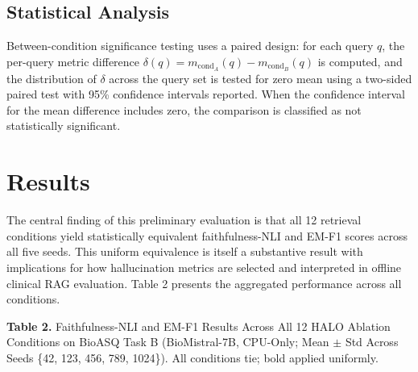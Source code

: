 \documentclass{article}
\begin{document}
\subsection{Statistical Analysis}

\label{sec:statistical_analysis}

Between-condition significance testing uses a paired design: for each query $q$, the per-query metric difference $\delta(q) = m_{\text{cond}_A}(q) - m_{\text{cond}_B}(q)$ is computed, and the distribution of $\delta$ across the query set is tested for zero mean using a two-sided paired test with 95\% confidence intervals reported. When the confidence interval for the mean difference includes zero, the comparison is classified as not statistically significant.

\section{Results}

\label{sec:results}

The central finding of this preliminary evaluation is that all 12 retrieval conditions yield statistically equivalent faithfulness-NLI and EM-F1 scores across all five seeds. This uniform equivalence is itself a substantive result with implications for how hallucination metrics are selected and interpreted in offline clinical RAG evaluation. Table 2 presents the aggregated performance across all conditions.

\textbf{Table 2.} Faithfulness-NLI and EM-F1 Results Across All 12 HALO Ablation Conditions on BioASQ Task B (BioMistral-7B, CPU-Only; Mean $\pm$ Std Across Seeds \{42, 123, 456, 789, 1024\}). All conditions tie; bold applied uniformly.
\end{document}

